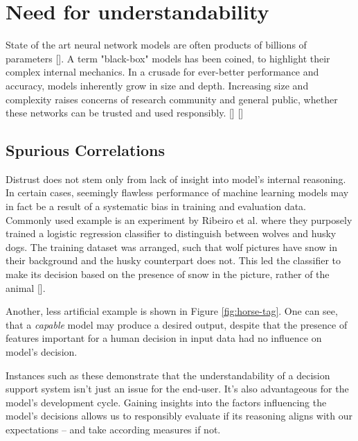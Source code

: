 

\section{Need for understandability}

State of the art neural network models are often products of billions of parameters []. A term "black-box" models has been coined, to highlight their complex internal mechanics. In a crusade for ever-better performance and accuracy, models inherently grow in size and depth. Increasing size and complexity raises concerns of research community and general public, whether these networks can be trusted and used responsibly. [] []


\subsection*{Spurious Correlations}
Distrust does not stem only from lack of insight into model's internal reasoning. In certain cases, seemingly flawless performance of machine learning models may in fact be a result of a systematic bias in training and evaluation data. Commonly used example is an experiment by Ribeiro et al. where they purposely trained a logistic regression classifier to distinguish between wolves and husky dogs. The training dataset was arranged, such that wolf pictures have snow in their background and the husky counterpart does not. This led the classifier to make its decision based on the presence of snow in the picture, rather of the animal []. 


Another, less artificial example is shown in Figure \ref{fig:horse-tag}. One can see, that a \emph{capable} model may produce a desired output, despite that the presence of features important for a human decision in input data had no influence on model's decision.

Instances such as these demonstrate that the understandability of a decision support system isn't just an issue for the end-user. It's also advantageous for the model's development cycle. Gaining insights into the factors influencing the model's decisions allows us to responsibly evaluate if its reasoning aligns with our expectations -- and take according measures if not.


